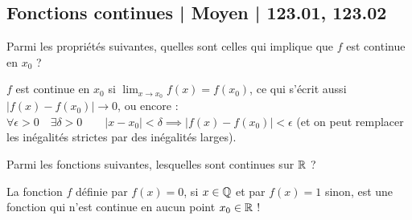 \subsection{Fonctions continues | Moyen | 123.01, 123.02}


\begin{question}

Parmi les propriétés suivantes, quelles sont celles qui implique que $f$ est continue en $x_ 0$ ?
\begin{answers}



    
\end{answers}
\begin{explanations}
$f$ est continue en $x_0$ si $\lim_{x\to x_0} f(x) = f(x_0)$, ce qui s'écrit aussi $\big| f(x) - f(x_0) \big| \to 0$, ou encore :
$\forall \epsilon >0 \quad \exists \delta > 0 \qquad
    |x-x_0| < \delta \implies |f(x)-f(x_0)| < \epsilon$ (et on peut remplacer les inégalités strictes par des inégalités larges).
\end{explanations}
\end{question}


\begin{question}

Parmi les fonctions suivantes, lesquelles sont continues sur $\mathbb{R}$ ?
\begin{answers}



   
\end{answers}
\begin{explanations}
La fonction $f$ définie par $f(x) = 0$, si $x\in \mathbb{Q}$ et par $f(x)=1$ sinon, est une fonction qui n'est continue en aucun point $x_0\in \mathbb{R}$ !
\end{explanations}
\end{question}


